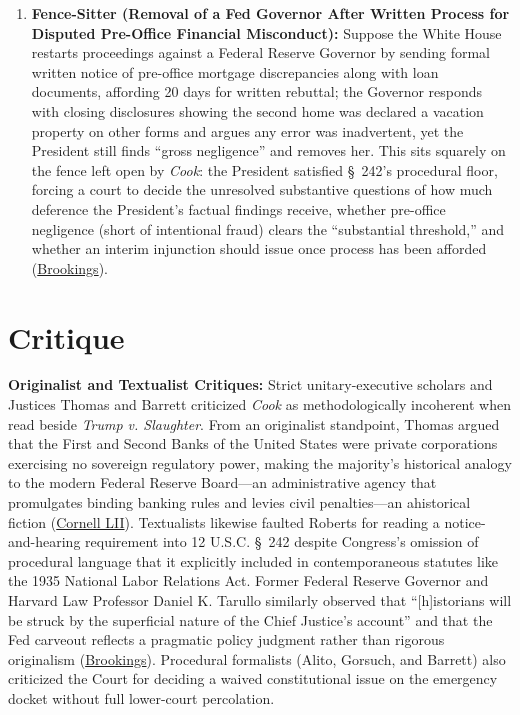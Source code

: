 \documentclass[12pt]{article}
\begin{document}
\begin{enumerate}
    \item \textbf{Fence-Sitter (Removal of a Fed Governor After Written Process for Disputed Pre-Office Financial Misconduct):} Suppose the White House restarts proceedings against a Federal Reserve Governor by sending formal written notice of pre-office mortgage discrepancies along with loan documents, affording 20 days for written rebuttal; the Governor responds with closing disclosures showing the second home was declared a vacation property on other forms and argues any error was inadvertent, yet the President still finds ``gross negligence'' and removes her. This sits squarely on the fence left open by \textit{Cook}: the President satisfied \S~242's procedural floor, forcing a court to decide the unresolved substantive questions of how much deference the President's factual findings receive, whether pre-office negligence (short of intentional fraud) clears the ``substantial threshold,'' and whether an interim injunction should issue once process has been afforded (\href{https://www.brookings.edu/articles/fed-independence-after-trump-v-cook/}{Brookings}).
\end{enumerate}

\section{Critique}

\textbf{Originalist and Textualist Critiques:} Strict unitary-executive scholars and Justices Thomas and Barrett criticized \textit{Cook} as methodologically incoherent when read beside \textit{Trump v. Slaughter}. From an originalist standpoint, Thomas argued that the First and Second Banks of the United States were private corporations exercising no sovereign regulatory power, making the majority's historical analogy to the modern Federal Reserve Board---an administrative agency that promulgates binding banking rules and levies civil penalties---an ahistorical fiction (\href{https://www.law.cornell.edu/supremecourt/text/25A312}{Cornell LII}). Textualists likewise faulted Roberts for reading a notice-and-hearing requirement into 12 U.S.C. \S~242 despite Congress's omission of procedural language that it explicitly included in contemporaneous statutes like the 1935 National Labor Relations Act. Former Federal Reserve Governor and Harvard Law Professor Daniel K. Tarullo similarly observed that ``[h]istorians will be struck by the superficial nature of the Chief Justice's account'' and that the Fed carveout reflects a pragmatic policy judgment rather than rigorous originalism (\href{https://www.brookings.edu/articles/fed-independence-after-trump-v-cook/}{Brookings}). Procedural formalists (Alito, Gorsuch, and Barrett) also criticized the Court for deciding a waived constitutional issue on the emergency docket without full lower-court percolation.
\end{document}
